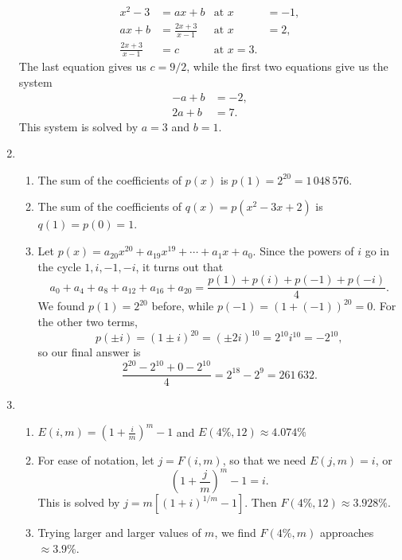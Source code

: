 \begin{enumerate}
\begin{align*}
x^2 - 3 &= ax + b & \text{at }x &= -1, \\
ax + b &= \frac{2x + 3}{x - 1} & \text{at }x &= 2, \\
\frac{2x + 3}{x - 1} &= c & \text{at }x = 3.
\end{align*}
The last equation gives us $c = 9/2$, while the first two equations give us the system
\begin{align*}
-a + b &= -2, \\
2a + b &= 7.
\end{align*}
This system is solved by $a = 3$ and $b = 1$.
\item \begin{enumerate}
\item The sum of the coefficients of $p(x)$ is $p(1) = \boxed{2^{20}} = 1\,048\,576$.
\item The sum of the coefficients of $q(x) = p(x^2 - 3x + 2)$ is $q(1) = p(0) = \boxed{1}$.
\item Let $p(x) = a_{20}x^{20} + a_{19}x^{19} + \cdots + a_1x + a_0$. Since the powers of $i$ go in the cycle $1, i, -1, -i$, it turns out that
\begin{equation*}
a_0 + a_4 + a_8 + a_{12} + a_{16} + a_{20} = \frac{p(1) + p(i) + p(-1) + p(-i)}{4}.
\end{equation*}
We found $p(1) = 2^{20}$ before, while $p(-1) = (1 + (-1))^{20} = 0$. For the other two terms,
\begin{equation*}
p(\pm i) = (1\pm i)^{20} = (\pm 2i)^{10} = 2^{10}i^{10} = -2^{10},
\end{equation*}
so our final answer is 
\begin{equation*}
\frac{2^{20} - 2^{10} + 0 - 2^{10}}{4} = \boxed{2^{18} - 2^9} = 261\,632.
\end{equation*}
\end{enumerate}
\item \begin{enumerate}
\item $\displaystyle E(i, m) = \left(1 + \frac{i}{m}\right)^m - 1$ and $\displaystyle E(4\%, 12)\approx 4.074\%$
\item For ease of notation, let $j = F(i,m)$, so that we need $E(j,m) = i$, or
\begin{equation*}
\left(1 + \frac{j}{m}\right)^m - 1 = i.
\end{equation*}
This is solved by $j = m\left[(1 + i)^{1/m} - 1\right]$. Then $F(4\%, 12)\approx 3.928\%$.
\item Trying larger and larger values of $m$, we find $F(4\%, m)$ approaches $\approx 3.9\%$.

\end{enumerate}
\end{enumerate}
